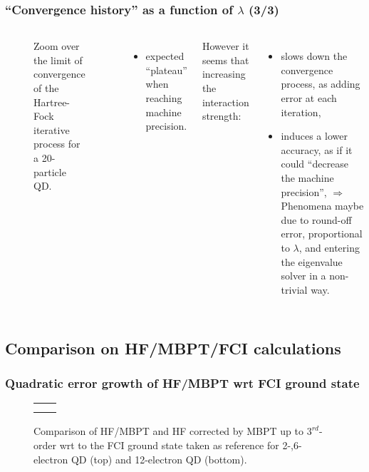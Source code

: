 \documentclass[xcolor=pdftex,hyperref={pdfpagelabels=false},table]{beamer}
\begin{document}
\begin{frame}
\frametitle{``Convergence history'' as a function of $\lambda$ (3/3)}
\begin{scriptsize}
\begin{columns}[T,l]
\column{6cm}
\begin{flushleft}
\begin{figure}
\centering
\scalebox{0.4}{}
\caption{Zoom over the limit of convergence of the Hartree-Fock iterative process for a 20-particle QD.}
\end{figure}
\end{flushleft}
\column{5cm}
\begin{itemize}
 \item  expected ``plateau'' when reaching machine precision.
\end{itemize}

However it seems that increasing the interaction strength:
\begin{itemize}
 \item  slows down the convergence process, as adding error at each iteration,
\item induces a lower accuracy, as if it could ``decrease the machine precision'',
\newline $\Rightarrow$ Phenomena maybe due to round-off error, proportional to $\lambda$, and entering the eigenvalue solver in a non-trivial way.
\end{itemize}
\end{columns}
\end{scriptsize}
\end{frame}

\subsection{Comparison on HF/MBPT/FCI calculations}
\begin{frame}
\frametitle{Quadratic error growth of HF/MBPT wrt FCI ground state}
\begin{figure}
\begin{tabular}{cc}
	\scalebox{0.32}{} & 	\scalebox{0.32}{}  \\
	\scalebox{0.32}{}  & \\
\end{tabular}
	\vspace{-5pt}
	\caption{Comparison of HF/MBPT and HF corrected by MBPT up to $3^{rd}$-order wrt to the FCI ground state taken as reference for 2-,6-electron QD (top) and 12-electron QD (bottom).}
\end{figure}
\end{frame}
\end{document}
